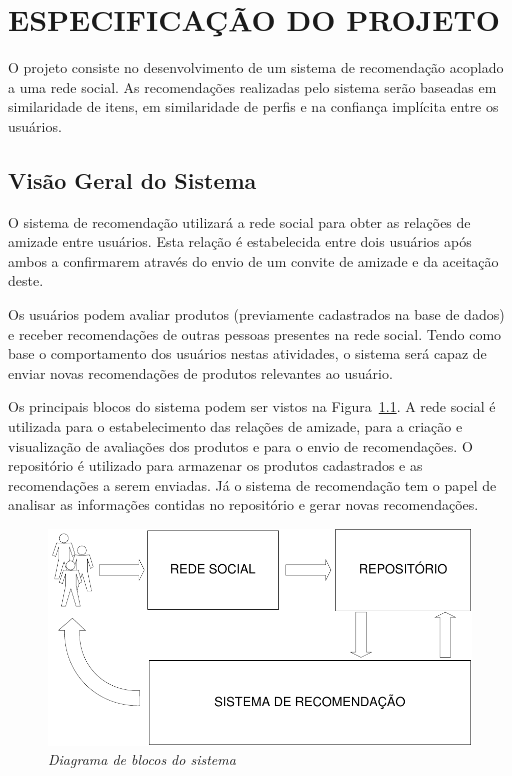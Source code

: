 \chapter{ESPECIFICAÇÃO DO PROJETO} %
\label{cha:especificacao_do_projeto}

 O projeto consiste no desenvolvimento de um sistema de recomendação acoplado a uma rede social. As recomendações realizadas pelo sistema serão baseadas em similaridade de itens, em similaridade de perfis e na confiança implícita entre os usuários.

\section{Visão Geral do Sistema} %
\label{sec:visao_do_sistema}

O sistema de recomendação utilizará a rede social para obter as relações de amizade entre usuários. Esta relação é estabelecida entre dois usuários após ambos a confirmarem através do envio de um convite de amizade e da aceitação deste.

Os usuários podem avaliar produtos (previamente cadastrados na base de dados) e receber recomendações de outras pessoas presentes na rede social. Tendo como base o comportamento dos usuários nestas atividades, o sistema será capaz de enviar novas recomendações de produtos relevantes ao usuário.

 Os principais blocos do sistema podem ser vistos na Figura~\ref{fig:escopo}. A rede social é utilizada para o estabelecimento das relações de amizade, para a criação e visualização de avaliações dos produtos e para o envio de recomendações. O repositório é utilizado para armazenar os produtos cadastrados e as recomendações a serem enviadas. Já o sistema de recomendação tem o papel de analisar as informações contidas no repositório e gerar novas recomendações.

\begin{figure}
  \centering
  \includegraphics[width=\textwidth]{imagens/Diagrama_Visao_Geral}
  \caption{\it Diagrama de blocos do sistema}
  \label{fig:escopo}
\end{figure}

